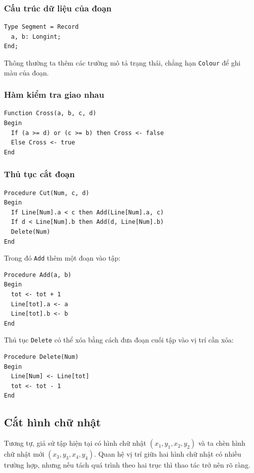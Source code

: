 \documentclass[11pt]{article}
\begin{document}
\subsubsection{Cấu trúc dữ liệu của đoạn}

\begin{verbatim}
Type Segment = Record
  a, b: Longint;
End;
\end{verbatim}
Thông thường ta thêm các trường mô tả trạng thái, chẳng hạn \texttt{Colour}
để ghi màu của đoạn.

\subsubsection{Hàm kiểm tra giao nhau}

\begin{verbatim}
Function Cross(a, b, c, d)
Begin
  If (a >= d) or (c >= b) then Cross <- false
  Else Cross <- true
End
\end{verbatim}

\subsubsection{Thủ tục cắt đoạn}

\begin{verbatim}
Procedure Cut(Num, c, d)
Begin
  If Line[Num].a < c then Add(Line[Num].a, c)
  If d < Line[Num].b then Add(d, Line[Num].b)
  Delete(Num)
End
\end{verbatim}

Trong đó \texttt{Add} thêm một đoạn vào tập:
\begin{verbatim}
Procedure Add(a, b)
Begin
  tot <- tot + 1
  Line[tot].a <- a
  Line[tot].b <- b
End
\end{verbatim}
Thủ tục \texttt{Delete} có thể xóa bằng cách đưa đoạn cuối tập vào vị trí cần
xóa:
\begin{verbatim}
Procedure Delete(Num)
Begin
  Line[Num] <- Line[tot]
  tot <- tot - 1
End
\end{verbatim}

\subsection{Cắt hình chữ nhật}

Tương tự, giả sử tập hiện tại có hình chữ nhật
$(x_1,y_1,x_2,y_2)$ và ta chèn hình chữ nhật mới
$(x_3,y_3,x_4,y_4)$. Quan hệ vị trí giữa hai hình chữ nhật có nhiều trường
hợp, nhưng nếu tách quá trình theo hai trục thì thao tác trở nên rõ ràng.
\end{document}
